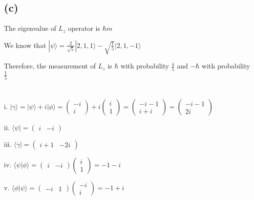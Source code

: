 \documentclass[12pt]{article}
\begin{document}
\begin{spacing}{2.0}
\subsection*{(c)}
The eigenvalue of $L_z$ operator is $\hbar m$

We know that $|\psi\rangle=\frac{2}{\sqrt{5}} |2,1,1\rangle - \sqrt{\frac{1}{5}}|2,1,-1\rangle$

Therefore, the measurement of $L_z$ is $\hbar$ with probability $\frac{4}{5}$ and $-\hbar$ with probability $\frac{1}{5}$

\section{} %

i. $|\gamma \rangle= |\psi\rangle + i|\phi\rangle= \left(
\begin{array}{c}
-i\\
i
\end{array}
\right)+ i\left(
\begin{array}{c}
i\\
1
\end{array}
\right)= \left(
\begin{array}{c}
-i-1\\
i+i
\end{array}
\right)= \left(
\begin{array}{c}
-i-1\\
2i
\end{array}
\right)$

ii. $\langle \psi|=\left(
\begin{array}{cc}
i & -i
\end{array}
\right)$

iii. $\langle \gamma|= \left(
\begin{array}{cc}
i+1 & -2i
\end{array}
\right)$

iv. $\langle \psi|\phi \rangle= \left(
\begin{array}{cc}
i & -i
\end{array}
\right)\left(
\begin{array}{c}
i\\
1
\end{array}
\right)= -1-i$

v. $\langle \phi|\psi \rangle= \left(
\begin{array}{cc}
-i & 1
\end{array}
\right)\left(
\begin{array}{c}
-i\\
i
\end{array}
\right)=-1+i$


\end{spacing}
\end{document}
